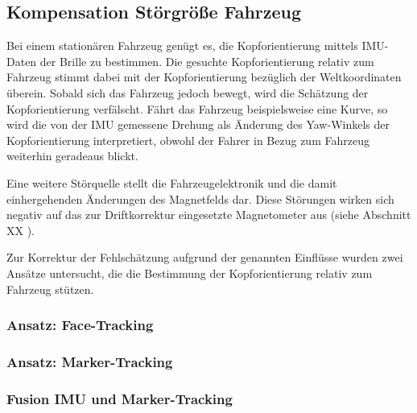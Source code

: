 
\subsection{Kompensation Störgröße Fahrzeug}

Bei einem stationären Fahrzeug genügt es, die Kopforientierung mittels \acs{IMU}-Daten der Brille zu bestimmen. Die gesuchte Kopforientierung relativ zum Fahrzeug stimmt dabei mit der Kopforientierung bezüglich der Weltkoordinaten überein. Sobald sich das Fahrzeug jedoch bewegt, wird die Schätzung der Kopforientierung verfälscht. Fährt das Fahrzeug beispielsweise eine Kurve, so wird die von der IMU gemessene Drehung als Änderung des Yaw-Winkels der Kopforientierung interpretiert, obwohl der Fahrer in Bezug zum Fahrzeug weiterhin geradeaus blickt.

Eine weitere Störquelle stellt die Fahrzeugelektronik und die damit einhergehenden Änderungen des Magnetfelds dar. Diese Störungen wirken sich negativ auf das zur Driftkorrektur eingesetzte Magnetometer aus (siehe Abschnitt XX ).

Zur Korrektur der Fehlschätzung aufgrund der genannten Einflüsse wurden zwei Ansätze untersucht, die die Bestimmung der Kopforientierung relativ zum Fahrzeug stützen.

\subsubsection{Ansatz: Face-Tracking}



\subsubsection{Ansatz: Marker-Tracking}



\subsubsection{Fusion IMU und Marker-Tracking}
